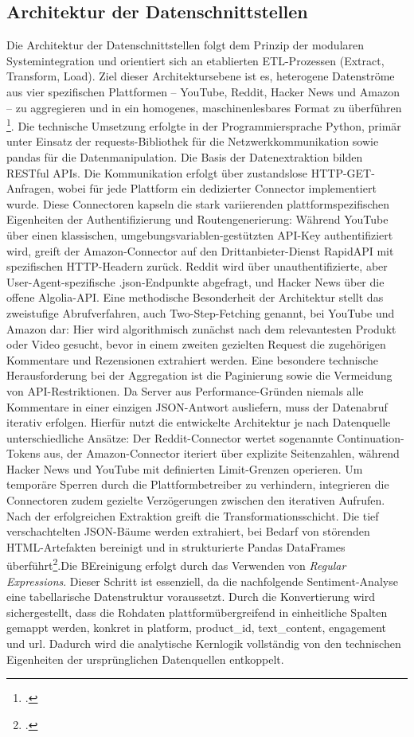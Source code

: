 \documentclass[12pt]{article}
\begin{document}
\subsection{Architektur der Datenschnittstellen}
Die Architektur der Datenschnittstellen folgt dem Prinzip der modularen Systemintegration und orientiert sich an etablierten ETL-Prozessen (Extract, Transform, Load). Ziel dieser Architektursebene ist es, heterogene Datenströme aus vier spezifischen Plattformen – YouTube, Reddit, Hacker News und Amazon – zu aggregieren und in ein homogenes, maschinenlesbares Format zu überführen \footcite[5]{nelli-2015}. Die technische Umsetzung erfolgte in der Programmiersprache Python, primär unter Einsatz der requests-Bibliothek für die Netzwerkkommunikation sowie pandas für die Datenmanipulation. Die Basis der Datenextraktion bilden RESTful APIs. Die Kommunikation erfolgt über zustandslose HTTP-GET-Anfragen, wobei für jede Plattform ein dedizierter Connector implementiert wurde. Diese Connectoren kapseln die stark variierenden plattformspezifischen Eigenheiten der Authentifizierung und Routengenerierung: Während YouTube über einen klassischen, umgebungsvariablen-gestützten API-Key authentifiziert wird, greift der Amazon-Connector auf den Drittanbieter-Dienst RapidAPI mit spezifischen HTTP-Headern zurück. Reddit wird über unauthentifizierte, aber User-Agent-spezifische .json-Endpunkte abgefragt, und Hacker News über die offene Algolia-API. Eine methodische Besonderheit der Architektur stellt das zweistufige Abrufverfahren, auch Two-Step-Fetching genannt, bei YouTube und Amazon dar: Hier wird algorithmisch zunächst nach dem relevantesten Produkt oder Video gesucht, bevor in einem zweiten gezielten Request die zugehörigen Kommentare und Rezensionen extrahiert werden. Eine besondere technische Herausforderung bei der Aggregation ist die Paginierung  sowie die Vermeidung von API-Restriktionen. Da Server aus Performance-Gründen niemals alle Kommentare in einer einzigen JSON-Antwort ausliefern, muss der Datenabruf iterativ erfolgen. Hierfür nutzt die entwickelte Architektur je nach Datenquelle unterschiedliche Ansätze: Der Reddit-Connector wertet sogenannte Continuation-Tokens aus, der Amazon-Connector iteriert über explizite Seitenzahlen, während Hacker News und YouTube mit definierten Limit-Grenzen operieren. Um temporäre Sperren durch die Plattformbetreiber zu verhindern, integrieren die Connectoren zudem gezielte Verzögerungen zwischen den iterativen Aufrufen. Nach der erfolgreichen Extraktion greift die Transformationsschicht. Die tief verschachtelten JSON-Bäume werden extrahiert, bei Bedarf von störenden HTML-Artefakten bereinigt und in strukturierte Pandas DataFrames überführt\footcite[119]{nelli-2015}.Die BEreinigung erfolgt durch das Verwenden von \textit{Regular Expressions}. Dieser Schritt ist essenziell, da die nachfolgende Sentiment-Analyse eine tabellarische Datenstruktur voraussetzt. Durch die Konvertierung wird sichergestellt, dass die Rohdaten plattformübergreifend in einheitliche Spalten gemappt werden, konkret in platform, product\_id, text\_content, engagement und url. Dadurch wird die analytische Kernlogik vollständig von den technischen Eigenheiten der ursprünglichen Datenquellen entkoppelt.
\end{document}
